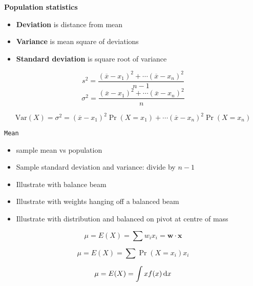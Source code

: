 \textbf{Population statistics}
\begin{itemize}
\item \textbf{Deviation} is distance from mean
\item \textbf{Variance} is mean square of deviations
\item \textbf{Standard deviation} is square root of variance
\end{itemize}
\begin{displaymath}
  s^2 = \frac{(\overline x - x_1)^2 + \dotsb (\overline x - x_n)^2}{n-1}
\end{displaymath}
\begin{displaymath}
  \sigma^2 = \frac{(\overline x - x_1)^2 + \dotsb (\overline x - x_n)^2}{n}
\end{displaymath}

\begin{displaymath}
  \mbox{Var}(X) = \sigma^2 = (\overline x - x_1)^2 \Pr(X=x_1) + \dotsb
  (\overline x - x_n)^2 \Pr(X=x_n)
\end{displaymath}

\texttt{Mean}
\begin{itemize}
\item sample mean vs population
\item Sample standard deviation and variance: divide by $n-1$
\item Illustrate with balance beam
\item Illustrate with weights hanging off a balanced beam
\item Illustrate with distribution and balanced on pivot at centre of mass
\end{itemize}

\begin{displaymath}
  \mu = E(X) = \sum w_i x_i = \mathbf{w\cdot x}
\end{displaymath}

\begin{displaymath}
  \mu = E(X) = \sum \Pr(X=x_i) x_i  
\end{displaymath}

\begin{displaymath}
  \mu = E(X) = \int xf(x) \,\mathrm{d}{x}
\end{displaymath}



